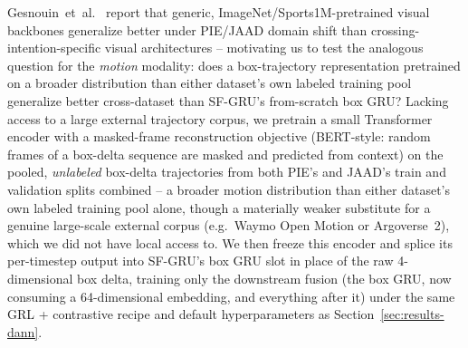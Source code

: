 Gesnouin~et~al.~\cite{gesnouin2022} report that generic,
ImageNet/Sports1M-pretrained visual backbones generalize better under
PIE/JAAD domain shift than crossing-intention-specific visual
architectures -- motivating us to test the analogous question for the
\emph{motion} modality: does a box-trajectory representation pretrained
on a broader distribution than either dataset's own labeled training
pool generalize better cross-dataset than SF-GRU's from-scratch box
GRU? Lacking access to a large external trajectory corpus, we pretrain
a small Transformer encoder with a masked-frame reconstruction
objective (BERT-style: random frames of a box-delta sequence are
masked and predicted from context) on the pooled, \emph{unlabeled}
box-delta trajectories from both PIE's and JAAD's train and validation
splits combined -- a broader motion distribution than either dataset's
own labeled training pool alone, though a materially weaker substitute
for a genuine large-scale external corpus (e.g.\ Waymo Open Motion or
Argoverse~2), which we did not have local access to. We then freeze
this encoder and splice its per-timestep output into SF-GRU's box GRU
slot in place of the raw 4-dimensional box delta, training only the
downstream fusion (the box GRU, now consuming a 64-dimensional
embedding, and everything after it) under the same GRL + contrastive
recipe and default hyperparameters as Section~\ref{sec:results-dann}.

